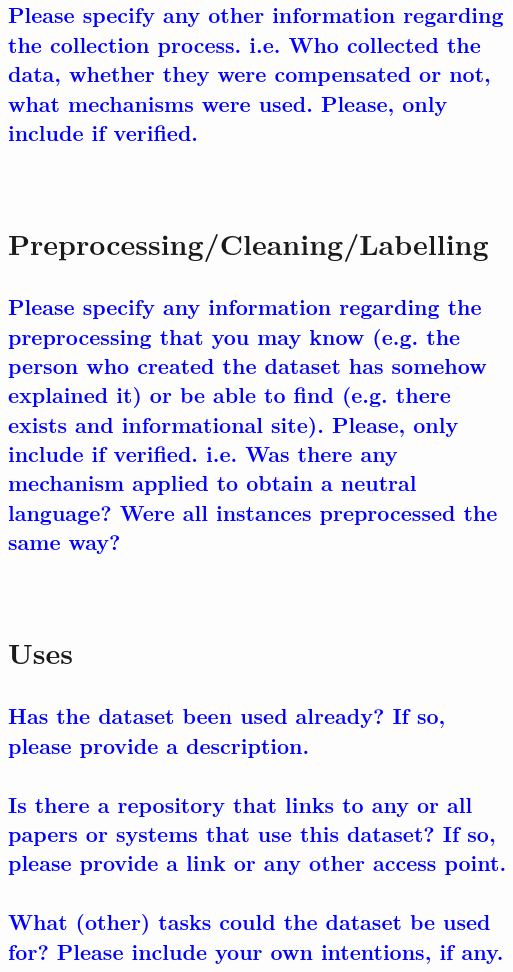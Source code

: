 \documentclass[letterpaper, 10 pt, conference]{ieeeconf}  %
\begin{document}
\textcolor{blue}{\subsection{Please specify any other information regarding the collection process. i.e. Who collected the data, whether they were compensated or not, what mechanisms were used. Please, only include if verified.}}
\lipsum[1]
\\



\section{Preprocessing/Cleaning/Labelling}

\textcolor{blue}{\subsection{Please specify any information regarding the preprocessing that you may know (e.g. the person who created the dataset has somehow explained it) or be able to find (e.g. there exists and informational site). Please, only include if verified. i.e. Was there any mechanism applied to obtain a neutral language? Were all instances preprocessed the same way?}}
\lipsum[1]
\\



\section{Uses}

\textcolor{blue}{\subsection{Has the dataset been used already? If so, please provide a description.}}
\lipsum[1]

\textcolor{blue}{\subsection{Is there a repository that links to any or all papers or systems that use this dataset? If so, please provide a link or any other access point.}}
\lipsum[1]

\textcolor{blue}{\subsection{What (other) tasks could the dataset be used for? Please include your own intentions, if any.}}
\lipsum[1]
\end{document}
